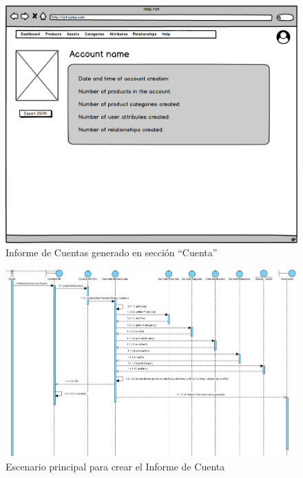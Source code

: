 \begin{figure}[H]
    \includegraphics[width=1\linewidth]{mockups/RF1.9CrearInformeCuenta.png}
    \caption{Informe de Cuentas generado en sección \enquote{Cuenta}}
   \end{figure}
\vspace{1.0cm}

\newpage

\begin{figure}[H]
    \includegraphics[width=1\linewidth]{sequence/RF1.9 Crear informe de cuenta.jpg}
    \caption{Escenario principal para crear el Informe de Cuenta}
   \end{figure}
\vspace{1.0cm}

\newpage %